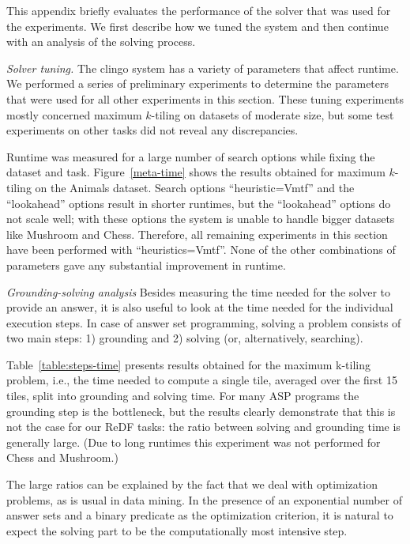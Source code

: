 This appendix briefly evaluates the performance of the solver that was used for the experiments. We first describe how we tuned the system and then continue with an analysis of the solving process.

\textit{Solver tuning.} The clingo system \citep{gebser2011potassco} has a variety of parameters that affect runtime. We performed a series of preliminary experiments to determine the parameters that were used for all other experiments in this section. These tuning experiments mostly concerned maximum $k$-tiling on datasets of moderate size, but some test experiments on other tasks did not reveal any discrepancies. 

Runtime was measured for a large number of search options while fixing the dataset and task. Figure~\ref{meta-time} shows the results obtained for maximum $k$-tiling on the Animals dataset. 
Search options ``heuristic=Vmtf'' and the ``lookahead'' options result in shorter runtimes, but the ``lookahead'' options do not scale well; with these options the system is unable to handle bigger datasets like Mushroom and Chess. Therefore, all remaining experiments in this section have been performed with ``heuristics=Vmtf''. None of the other combinations of parameters gave any substantial improvement in runtime.

\textit{Grounding-solving analysis} Besides measuring the time needed for the solver to provide an answer, it is also useful to look at the time needed for the individual execution steps. In case of answer set programming, solving a problem consists of two main steps: 1) grounding and 2) solving (or, alternatively, searching). 

Table~\ref{table:steps-time} presents results obtained for the maximum k-tiling problem, i.e., the time needed to compute a single tile, averaged over the first 15 tiles, split into grounding and solving time. For many ASP programs the grounding step is the bottleneck, but the results clearly demonstrate that this is not the case for our ReDF tasks: the ratio between solving and grounding time is generally large. (Due to long runtimes this experiment was not performed for Chess and Mushroom.)

The large ratios can be explained by the fact that we deal with optimization problems, as is usual in data mining. In the presence of an exponential number of answer sets and a binary predicate as the optimization criterion, it is natural to expect the solving part to be the computationally most intensive step. 

